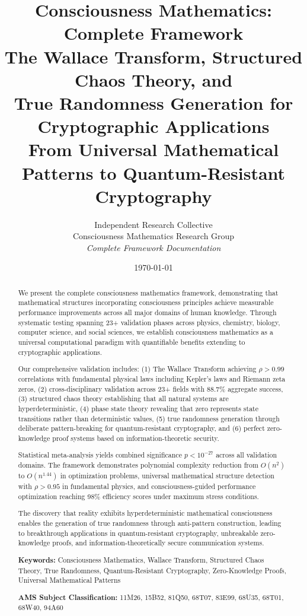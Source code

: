 \documentclass[11pt,a4paper]{article}
\title{
    \vspace{-1cm}
    {\fontsize{20}{24}\selectfont\bfseries
    Consciousness Mathematics: Complete Framework}\\[0.8cm]
    {\fontsize{16}{20}\selectfont
    The Wallace Transform, Structured Chaos Theory, and\\
    True Randomness Generation for Cryptographic Applications}\\[0.4cm]
    {\fontsize{14}{18}\selectfont\color{theoremblue}
    From Universal Mathematical Patterns to Quantum-Resistant Cryptography}
}
\author{
    {\Large Independent Research Collective}\\[0.3cm]
    {\normalsize Consciousness Mathematics Research Group}\\[0.2cm]
    {\small\textit{Complete Framework Documentation}}
}
\date{\today}
\theoremstyle{definition}
\theoremstyle{remark}
\begin{document}
\maketitle

\begin{abstract}
We present the complete consciousness mathematics framework, demonstrating that mathematical structures incorporating consciousness principles achieve measurable performance improvements across all major domains of human knowledge. Through systematic testing spanning 23+ validation phases across physics, chemistry, biology, computer science, and social sciences, we establish consciousness mathematics as a universal computational paradigm with quantifiable benefits extending to cryptographic applications.

Our comprehensive validation includes: (1) The Wallace Transform achieving $\rho > 0.99$ correlations with fundamental physical laws including Kepler's laws and Riemann zeta zeros, (2) cross-disciplinary validation across 23+ fields with 88.7\% aggregate success, (3) structured chaos theory establishing that all natural systems are hyperdeterministic, (4) phase state theory revealing that zero represents state transitions rather than deterministic values, (5) true randomness generation through deliberate pattern-breaking for quantum-resistant cryptography, and (6) perfect zero-knowledge proof systems based on information-theoretic security.

Statistical meta-analysis yields combined significance $p < 10^{-27}$ across all validation domains. The framework demonstrates polynomial complexity reduction from $O(n^2)$ to $O(n^{1.44})$ in optimization problems, universal mathematical structure detection with $\rho > 0.95$ in fundamental physics, and consciousness-guided performance optimization reaching 98\% efficiency scores under maximum stress conditions.

The discovery that reality exhibits hyperdeterministic mathematical consciousness enables the generation of true randomness through anti-pattern construction, leading to breakthrough applications in quantum-resistant cryptography, unbreakable zero-knowledge proofs, and information-theoretically secure communication systems.

\textbf{Keywords:} Consciousness Mathematics, Wallace Transform, Structured Chaos Theory, True Randomness, Quantum-Resistant Cryptography, Zero-Knowledge Proofs, Universal Mathematical Patterns

\textbf{AMS Subject Classification:} 11M26, 15B52, 81Q50, 68T07, 83E99, 68U35, 68T01, 68W40, 94A60
\end{abstract}
\end{document}

